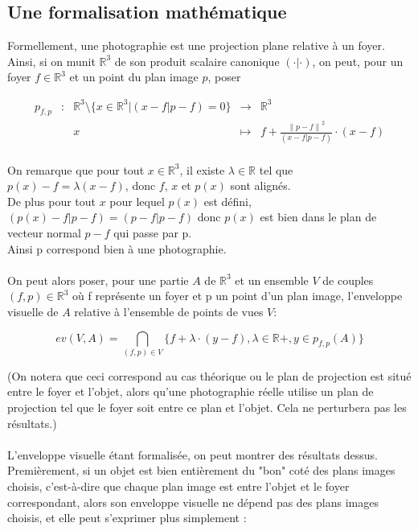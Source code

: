 \documentclass[a4paper]{article}
\newcommand{\norm}[1]{\left\lVert#1\right\rVert}
\begin{document}
    \subsection{Une formalisation mathématique}
      Formellement, une photographie est une projection plane relative à un foyer. Ainsi, si on munit $\mathbb{R}^{3}$ de son produit scalaire canonique $(\cdot|\cdot)$, on peut, pour un foyer $f \in \mathbb{R}^3$ et un point du plan image $p$, poser
      
      \[
      \begin{array}{ccrcl}
        p_{f, p} & : & \mathbb{R}^{3}\setminus\{x \in \mathbb{R}^3 | (x - f | p - f) = 0\} & \to     & \mathbb{R}^{3}\\
          &   & x              & \mapsto & f + \frac{\norm{p - f}^2}{(x - f | p - f)} \cdot (x - f)\\
      \end{array}
      \]

      On remarque que pour tout $x \in \mathbb{R}^3$, il existe $\lambda \in \mathbb{R}$ tel que $p(x) - f = \lambda (x - f)$, donc $f$, $x$ et $p(x)$ sont alignés.\\
      De plus pour tout $x$ pour lequel $p(x)$ est défini, $(p(x) - f | p - f) = (p - f | p - f)$ donc $p(x)$ est bien dans le plan de vecteur normal $p - f$ qui passe par p.\\
      Ainsi p correspond bien à une photographie.\\
      \\
      On peut alors poser, pour une partie $A$ de $\mathbb{R}^3$ et un ensemble $V$ de couples $(f, p) \in \mathbb{R}^3$ où f représente un foyer et p un point d'un plan image, l'enveloppe visuelle de $A$ relative à l'ensemble de points de vues $V$:
      
      \[ev(V, A) = \bigcap_{(f, p) \in V}\{f + \lambda \cdot (y - f), \lambda \in \mathbb{R}+, y \in p_{f, p}(A)\}\]

      (On notera que ceci correspond au cas théorique ou le plan de projection est situé entre le foyer et l'objet, alors qu'une photographie réelle utilise un plan de projection tel que le foyer soit entre ce plan et l'objet. Cela ne perturbera pas les résultats.)\\
      \\
      L'enveloppe visuelle étant formalisée, on peut montrer des résultats dessus.\\
      Premièrement, si un objet est bien entièrement du "bon" coté des plans images choisis, c'est-à-dire que chaque plan image est entre l'objet et le foyer correspondant, alors son enveloppe visuelle ne dépend pas des plans images choisis, et elle peut s'exprimer plus simplement :
\end{document}
